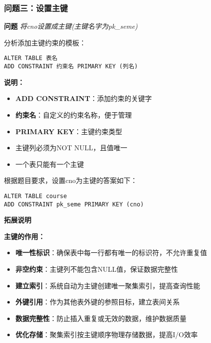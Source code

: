 \subsubsection{问题三：设置主键}

\textbf{问题} \emph{将cno设置成主键(主键名字为pk\_seme)}

\qquad 分析添加主键约束的模板：

\begin{mdframed}[backgroundcolor=gray!10]
\begin{verbatim}
ALTER TABLE 表名
ADD CONSTRAINT 约束名 PRIMARY KEY (列名)
\end{verbatim}
\end{mdframed}

\textbf{说明：}
\begin{itemize}
  \item \textbf{ADD CONSTRAINT}：添加约束的关键字
  \item \textbf{约束名}：自定义的约束名称，便于管理
  \item \textbf{PRIMARY KEY}：主键约束类型
  \item 主键列必须为NOT NULL，且值唯一
  \item 一个表只能有一个主键
\end{itemize}

\qquad 根据题目要求，设置cno为主键的答案如下：

\begin{mdframed}[backgroundcolor=blue!5]
\begin{verbatim}
ALTER TABLE course
ADD CONSTRAINT pk_seme PRIMARY KEY (cno)
\end{verbatim}
\end{mdframed}

\textbf{拓展说明}

\begin{mdframed}[backgroundcolor=yellow!10]
  \textbf{主键的作用：}
  \begin{itemize}
    \item \textbf{唯一性标识}：确保表中每一行都有唯一的标识符，不允许重复值
    \item \textbf{非空约束}：主键列不能包含NULL值，保证数据完整性
    \item \textbf{建立索引}：系统自动为主键创建唯一聚集索引，提高查询性能
    \item \textbf{外键引用}：作为其他表外键的参照目标，建立表间关系
    \item \textbf{数据完整性}：防止插入重复或无效的数据，维护数据质量
    \item \textbf{优化存储}：聚集索引按主键顺序物理存储数据，提高I/O效率
  \end{itemize}
\end{mdframed}

